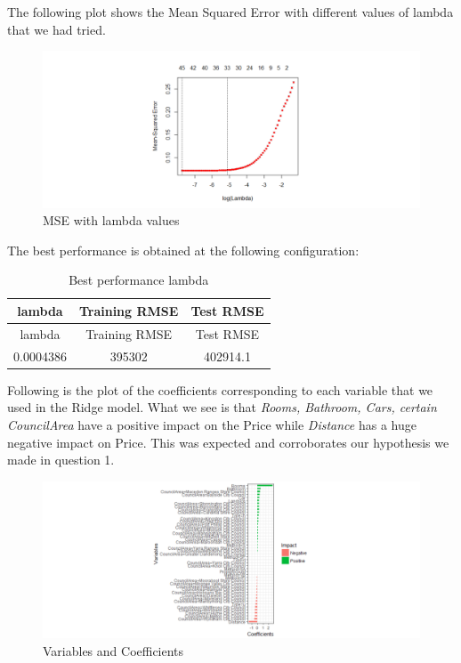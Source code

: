 \documentclass[]{article}
\begin{document}
The following plot shows the Mean Squared Error with different values of
lambda that we had tried.

\begin{figure}
\centering
\includegraphics{Report_files/figure-latex/unnamed-chunk-17-1.pdf}
\caption{MSE with lambda values}
\end{figure}

The best performance is obtained at the following configuration:

\begin{longtable}[]{@{}ccc@{}}
\caption{Best performance lambda}\tabularnewline
\toprule
lambda & Training RMSE & Test RMSE\tabularnewline
\midrule
\endfirsthead
\toprule
lambda & Training RMSE & Test RMSE\tabularnewline
\midrule
\endhead
0.0004386 & 395302 & 402914.1\tabularnewline
\bottomrule
\end{longtable}

Following is the plot of the coefficients corresponding to each variable
that we used in the Ridge model. What we see is that \emph{Rooms,
Bathroom, Cars, certain CouncilArea} have a positive impact on the Price
while \emph{Distance} has a huge negative impact on Price. This was
expected and corroborates our hypothesis we made in question 1.

\begin{figure}
\centering
\includegraphics{Report_files/figure-latex/unnamed-chunk-19-1.pdf}
\caption{Variables and Coefficients}
\end{figure}
\end{document}
